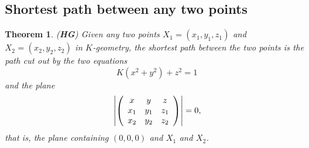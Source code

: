 \documentclass{article}%
\newtheorem{theorem}{Theorem}
\begin{document}
\subsection{Shortest path between any two points}

\begin{theorem}
(\textbf{HG}) Given any two points $X_{1}=\left(  x_{1},y_{1},z_{1}\right)  $
and $X_{2}=\left(  x_{2},y_{2},z_{2}\right)  $ in $K$-geometry, the shortest
path between the two points is the path cut out by the two equations%
\[
K\left(  x^{2}+y^{2}\right)  +z^{2}=1
\]
and the plane%
\begin{equation}
\left\vert \left(
\begin{array}
[c]{ccc}%
x & y & z\\
x_{1} & y_{1} & z_{1}\\
x_{2} & y_{2} & z_{2}%
\end{array}
\right)  \right\vert =0, \label{90}%
\end{equation}
that is, the plane containing $\left(  0,0,0\right)  $ and $X_{1}$ and $X_{2}$.
\end{theorem}
\end{document}
